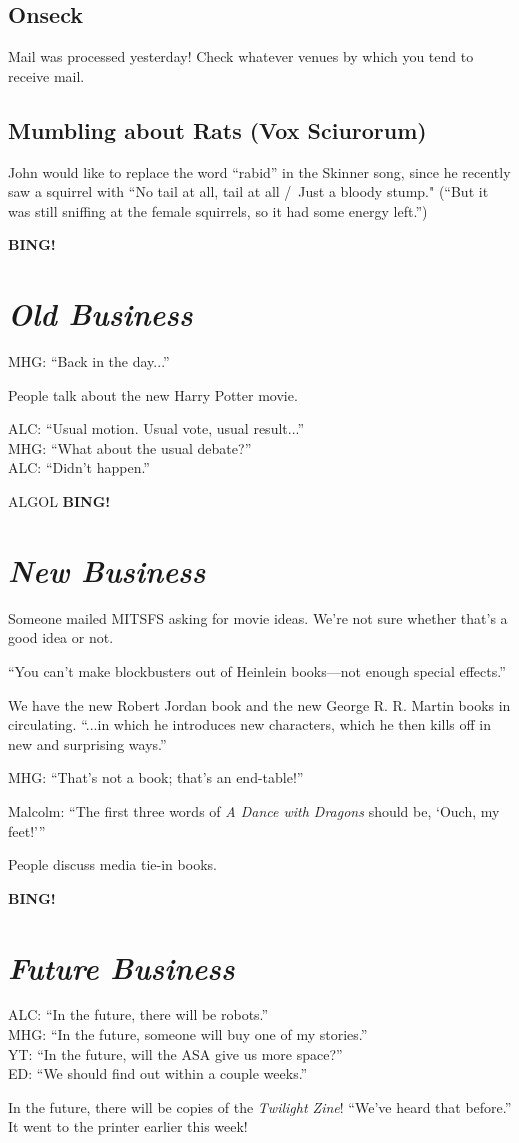 \documentclass[10pt]{article}
\newcommand{\bing}{{\bf BING!} }
\newcommand{\goto}[1]{\bing \vskip 12pt \section*{{\em{#1}}}}
\begin{document}
\subsection*{Onseck}
Mail was processed yesterday!  Check whatever venues by which you tend to receive mail.

\subsection*{Mumbling about Rats (Vox Sciurorum)}
John would like to replace the word ``rabid'' in the Skinner song, since he recently saw a squirrel
with ``No tail at all, tail at all /\ Just a bloody stump."  (``But it was still sniffing at the
female squirrels, so it had some energy left.'')

\goto{Old Business}

MHG: ``Back in the day...''

People talk about the new Harry Potter movie.

ALC: ``Usual motion.  Usual vote, usual result...''\\
MHG: ``What about the usual debate?''\\
ALC: ``Didn't happen.''

ALGOL
\goto{New Business}

Someone mailed MITSFS asking for movie ideas.  We're not sure whether that's a good idea or not.

``You can't make blockbusters out of Heinlein books---not enough special effects.''

We have the new Robert Jordan book and the new George R. R. Martin books in circulating.
``...in which he introduces new characters, which he then kills off in new and surprising ways.''

MHG: ``That's not a book; that's an end-table!''

Malcolm: ``The first three words of \emph{A Dance with Dragons} should be, `Ouch, my feet!'''

People discuss media tie-in books.

\goto{Future Business}

ALC: ``In the future, there will be robots.''\\
MHG: ``In the future, someone will buy one of my stories.''\\
YT: ``In the future, will the ASA give us more space?''\\
ED: ``We should find out within a couple weeks.''

In the future, there will be copies of the \emph{Twilight Zine}!  ``We've heard that before.''
It went to the printer earlier this week!
\end{document}
